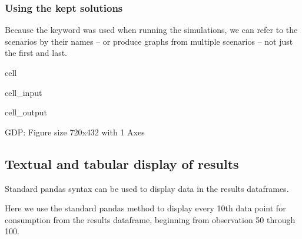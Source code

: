 \documentclass[letterpaper,10pt,english]{jupyterBook}
\begin{document}
\subsubsection{Using the kept solutions}
\label{\detokenize{content/03_Installation/TestingModelFlow:using-the-kept-solutions}}
\sphinxAtStartPar
Because the keyword  was used when running the simulations, we can refer to the scenarios by their names – or produce graphs from multiple scenarios – not just the first and last.

\begin{sphinxuseclass}{cell}\begin{sphinxVerbatimInput}

\begin{sphinxuseclass}{cell_input}
\begin{sphinxVerbatim}[commandchars=\\\{\}]
    
\end{sphinxVerbatim}

\end{sphinxuseclass}\end{sphinxVerbatimInput}
\begin{sphinxVerbatimOutput}

\begin{sphinxuseclass}{cell_output}
\begin{sphinxVerbatim}[commandchars=\\\{\}]
\PYGZob{}\PYGZsq{}GDP\PYGZsq{}: \PYGZlt{}Figure size 720x432 with 1 Axes\PYGZgt{}\PYGZcb{}
\end{sphinxVerbatim}

\end{sphinxuseclass}\end{sphinxVerbatimOutput}

\end{sphinxuseclass}

\subsection{Textual and tabular display of results}
\label{\detokenize{content/03_Installation/TestingModelFlow:textual-and-tabular-display-of-results}}
\sphinxAtStartPar
Standard pandas syntax can be used to display data in the results dataframes.

\sphinxAtStartPar
Here we use the standard pandas  method to display every 10th data point for consumption from the results dataframe, beginning from observation 50 through 100.
\end{document}
